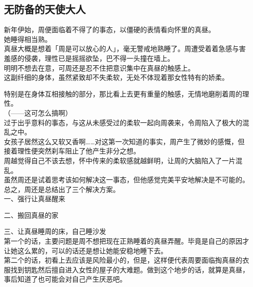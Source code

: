 \subsection{无防备的天使大人}

新年伊始，周便面临着不得了的事态，以僵硬的表情看向怀里的真昼。\\

她睡得相当熟。\\

真昼大概是想着「周是可以放心的人」，毫无警戒地熟睡了。周遭受着着急感与害羞感的侵袭，理性已是摇摇欲坠，巴不得一头撞在墙上。\\

明明不想去在意，可周还是忍不住把意识集中在真昼的触感上。\\

这副纤细的身体，虽然紧致却不失柔软，无处不体现着那女性特有的娇柔。

特别是在身体互相接触的部分，那比看上去更有重量的触感，无情地磨削着周的理性。\\

（——这可怎么搞啊）\\

过于出乎意料的事态，与这从未感受过的柔软一起向周袭来，令周陷入了极大的混乱之中。\\

女孩子居然这么又软又香啊……对这第一次知道的事实，周产生了微妙的感慨，但接着理性便突然刹车阻止了他产生非分之想。\\

周越觉得自己不该去想，怀中传来的柔软感就越鲜明，让周的大脑陷入了一片混乱。\\

虽然周还是试着思考该如何解决这一事态，但他感觉完美平安地解决是不可能的。\\

总之，周还是总结出了三个解决方案。\\

一、强行让真昼醒来

二、搬回真昼的家

三、让真昼睡周的床，自己睡沙发\\

第一个的话，主要问题是周不想把现在正熟睡着的真昼弄醒。毕竟是自己的原因才让她这么累的，可以的话还是想让她能安稳地睡下去。\\

第二个的话，初看上去应该是风险最小的，但是，这样便代表周要面临掏真昼的衣服找到钥匙然后擅自进入女性的屋子的大难题。做到这个地步的话，就算是真昼，事后知道了也可能会对自己产生厌恶吧。\\

